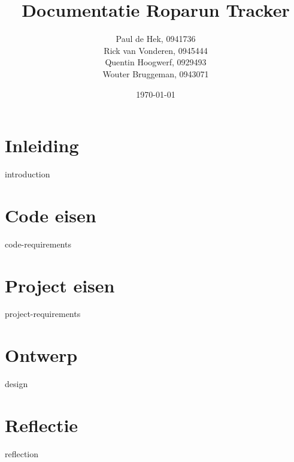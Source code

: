\documentclass[12pt, a4paper]{article}
\date{\today}
\title{\textbf{Documentatie Roparun Tracker}}
\author{
	Paul de Hek, 0941736 \\
	Rick van Vonderen, 0945444 \\
	Quentin Hoogwerf, 0929493 \\
	Wouter Bruggeman, 0943071 \\
}
\begin{document}
	\maketitle
	\thispagestyle{empty}
	\newpage

	\tableofcontents
	\setcounter{page}{1}
	\newpage

	\section{Inleiding}
	{introduction}
	\newpage

	\section{Code eisen}
	{code-requirements}
	\newpage

	\section{Project eisen}
	{project-requirements}
	\newpage

	\section{Ontwerp}
	{design}
	\newpage

	\section{Reflectie}
	{reflection}
	\newpage
\end{document}
